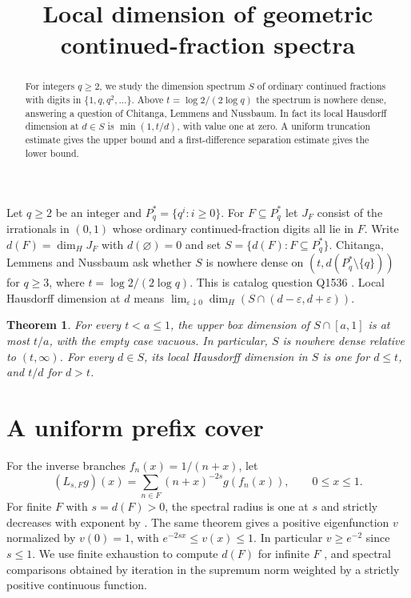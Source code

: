 \documentclass[11pt,a4paper]{amsart}
\title{Local dimension of geometric continued-fraction spectra}
\newtheorem{theorem}{Theorem}
\begin{document}
\begin{abstract}
For integers $q\ge2$, we study the dimension spectrum $S$ of ordinary continued fractions with digits in $\{1,q,q^2,\ldots\}$. Above $t=\log 2/(2\log q)$ the spectrum is nowhere dense, answering a question of Chitanga, Lemmens and Nussbaum. In fact its local Hausdorff dimension at $d\in S$ is $\min(1,t/d)$, with value one at zero. A uniform truncation estimate gives the upper bound and a first-difference separation estimate gives the lower bound.
\end{abstract}
\maketitle

Let $q\ge2$ be an integer and $P_q^*=\{q^i:i\ge0\}$. For $F\subseteq P_q^*$ let $J_F$ consist of the irrationals in $(0,1)$ whose ordinary continued-fraction digits all lie in $F$. Write $d(F)=\dim_H J_F$ with $d(\varnothing)=0$ and set $S=\{d(F):F\subseteq P_q^*\}$. Chitanga, Lemmens and Nussbaum \cite[Section~9]{cln} ask whether $S$ is nowhere dense on $(t,d(P_q^*\setminus\{q\}))$ for $q\ge3$, where $t=\log2/(2\log q)$. This is catalog question Q1536 \cite{q}. Local Hausdorff dimension at $d$ means $\lim_{\varepsilon\downarrow0}\dim_H(S\cap(d-\varepsilon,d+\varepsilon))$.

\begin{theorem}
For every $t<a\le1$, the upper box dimension of $S\cap[a,1]$ is at most $t/a$, with the empty case vacuous. In particular, $S$ is nowhere dense relative to $(t,\infty)$. For every $d\in S$, its local Hausdorff dimension in $S$ is one for $d\le t$, and $t/d$ for $d>t$.
\end{theorem}

\section{A uniform prefix cover}
For the inverse branches $f_n(x)=1/(n+x)$, let
\[
(L_{s,F}g)(x)=\sum_{n\in F}(n+x)^{-2s}g(f_n(x)),\qquad 0\le x\le1 .
\]
For finite $F$ with $s=d(F)>0$, the spectral radius is one at $s$ and strictly decreases with exponent by \cite[Theorem~1.6]{cln}. The same theorem gives a positive eigenfunction $v$ normalized by $v(0)=1$, with $e^{-2sx}\le v(x)\le1$. In particular $v\ge e^{-2}$ since $s\le1$. We use finite exhaustion to compute $d(F)$ for infinite $F$ \cite[Theorem~2.4]{cln}, and spectral comparisons obtained by iteration in the supremum norm weighted by a strictly positive continuous function.
\end{document}
